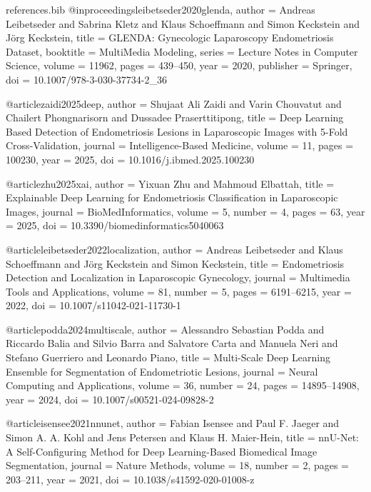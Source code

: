 \begin{filecontents*}{references.bib}
@inproceedings{leibetseder2020glenda,
  author    = {Andreas Leibetseder and Sabrina Kletz and Klaus Schoeffmann and Simon Keckstein and J{\"o}rg Keckstein},
  title     = {{GLENDA}: Gynecologic Laparoscopy Endometriosis Dataset},
  booktitle = {MultiMedia Modeling},
  series    = {Lecture Notes in Computer Science},
  volume    = {11962},
  pages     = {439--450},
  year      = {2020},
  publisher = {Springer},
  doi       = {10.1007/978-3-030-37734-2_36}
}

@article{zaidi2025deep,
  author  = {Shujaat Ali Zaidi and Varin Chouvatut and Chailert Phongnarisorn and Dussadee Praserttitipong},
  title   = {Deep Learning Based Detection of Endometriosis Lesions in Laparoscopic Images with 5-Fold Cross-Validation},
  journal = {Intelligence-Based Medicine},
  volume  = {11},
  pages   = {100230},
  year    = {2025},
  doi     = {10.1016/j.ibmed.2025.100230}
}

@article{zhu2025xai,
  author  = {Yixuan Zhu and Mahmoud Elbattah},
  title   = {Explainable Deep Learning for Endometriosis Classification in Laparoscopic Images},
  journal = {BioMedInformatics},
  volume  = {5},
  number  = {4},
  pages   = {63},
  year    = {2025},
  doi     = {10.3390/biomedinformatics5040063}
}

@article{leibetseder2022localization,
  author  = {Andreas Leibetseder and Klaus Schoeffmann and J{\"o}rg Keckstein and Simon Keckstein},
  title   = {Endometriosis Detection and Localization in Laparoscopic Gynecology},
  journal = {Multimedia Tools and Applications},
  volume  = {81},
  number  = {5},
  pages   = {6191--6215},
  year    = {2022},
  doi     = {10.1007/s11042-021-11730-1}
}

@article{podda2024multiscale,
  author  = {Alessandro Sebastian Podda and Riccardo Balia and Silvio Barra and Salvatore Carta and Manuela Neri and Stefano Guerriero and Leonardo Piano},
  title   = {Multi-Scale Deep Learning Ensemble for Segmentation of Endometriotic Lesions},
  journal = {Neural Computing and Applications},
  volume  = {36},
  number  = {24},
  pages   = {14895--14908},
  year    = {2024},
  doi     = {10.1007/s00521-024-09828-2}
}

@article{isensee2021nnunet,
  author  = {Fabian Isensee and Paul F. Jaeger and Simon A. A. Kohl and Jens Petersen and Klaus H. Maier-Hein},
  title   = {nnU-Net: A Self-Configuring Method for Deep Learning-Based Biomedical Image Segmentation},
  journal = {Nature Methods},
  volume  = {18},
  number  = {2},
  pages   = {203--211},
  year    = {2021},
  doi     = {10.1038/s41592-020-01008-z}
}


\end{filecontents*}
